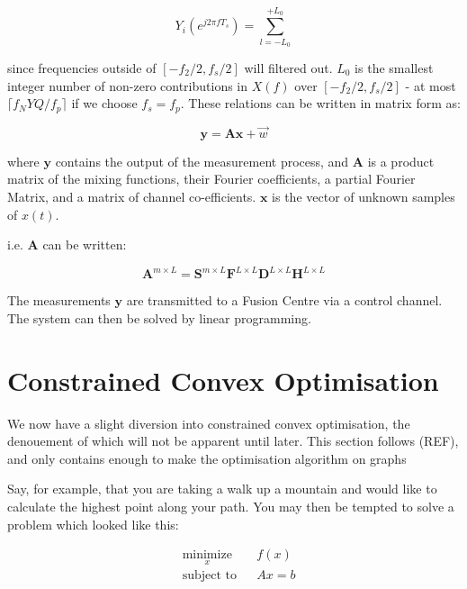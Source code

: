 \begin{equation}
Y_i\left(e^{j 2 \pi f T_s }\right) = \sum_{l = -L_0}^{+L_0}
\end{equation}

since frequencies outside of \([-f_2/2, f_s/2]\) will filtered out. \(L_0\) is the smallest integer number of non-zero contributions in \(X\left(f\right)\) over \([-f_2/2, f_s/2]\) - at most \(\lceil f_NYQ/f_p\rceil\) if we choose \(f_s = f_p\). These relations can be written in matrix form as:

\begin{equation}
\textbf{y} = \textbf{A}\textbf{x} + \vec{w}
\end{equation}

where \(\textbf{y}\) contains the output of the measurement process, and \(\textbf{A}\) is a product matrix of the mixing functions, their Fourier coefficients, a partial Fourier Matrix, and a matrix of channel co-efficients. \(\textbf{x}\) is the vector of unknown samples of \(x\left(t\right)\). 

i.e. \(\textbf{A}\) can be written: 

\begin{equation}
\textbf{A}^{m\times L} = \textbf{S}^{m\times L} \textbf{F}^{L\times L} \textbf{D}^{L \times L} \textbf{H}^{L \times L}
\label{system}
\end{equation}

The measurements \(\textbf{y}\) are transmitted to a Fusion Centre via a control channel. The system can then be solved by linear programming.

\section{Constrained Convex Optimisation}
We now have a slight diversion into constrained convex optimisation, the denouement of which will not be apparent until later. This section follows (REF), and only contains enough to make the optimisation algorithm on graphs

Say, for example, that you are taking a walk up a mountain and would like to calculate the highest point along your path. You may then be tempted to solve a problem which looked like this:

\begin{equation*}
\begin{aligned}
& \underset{x}{\text{minimize}}
& & f\left( x \right) \\
& \text{subject to}
& & Ax = b
\label{orig_problem}
\end{aligned}
\end{equation*}

